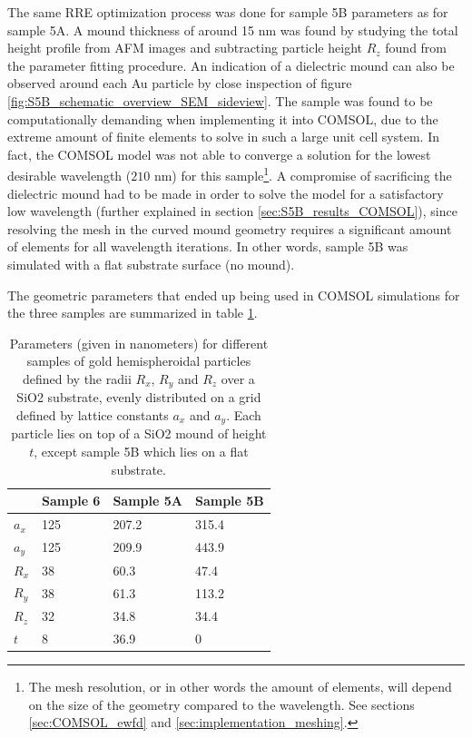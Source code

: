 The same RRE optimization process was done for sample 5B parameters as for sample 5A. A mound thickness of around 15 nm was found by studying the total height profile from AFM images and subtracting particle height $R_z$ found from the parameter fitting procedure. An indication of a dielectric mound can also be observed around each Au particle by close inspection of figure \ref{fig:S5B_schematic_overview_SEM_sideview}. The sample was found to be computationally demanding when implementing it into COMSOL, due to the extreme amount of finite elements to solve in such a large unit cell system. In fact, the COMSOL model was not able to converge a solution for the lowest desirable wavelength ($210$ nm) for this sample\footnote{The mesh resolution, or in other words the amount of elements, will depend on the size of the geometry compared to the wavelength. See sections \ref{sec:COMSOL_ewfd} and \ref{sec:implementation_meshing}.}. A compromise of sacrificing the dielectric mound had to be made in order to solve the model for a satisfactory low wavelength (further explained in section \ref{sec:S5B_results_COMSOL}), since resolving the mesh in the curved mound geometry requires a significant amount of elements for all wavelength iterations. In other words, sample 5B was simulated with a flat substrate surface (no mound). 

The geometric parameters that ended up being used in COMSOL simulations for the three samples are summarized in table \ref{tab:GoldLatticeParameters}. 





\begin{table}[h!]
\centering
\caption{Parameters (given in nanometers) for different samples of gold hemispheroidal particles defined by the radii $R_x$, $R_y$ and $R_z$ over a SiO2 substrate, evenly distributed on a grid defined by lattice constants $a_x$ and $a_y$. Each particle lies on top of a SiO2 mound of height $t$, except sample 5B which lies on a flat substrate.}
\label{tab:GoldLatticeParameters}
\begin{tabular}{l l l l}
            &   Sample 6    &   Sample 5A   &   Sample 5B   \\
    \hline 
    $a_x$   &   125       &   207.2         &   315.4            \\
    $a_y$   &   125       &   209.9         &   443.9            \\
    $R_x$   &   38        &   60.3          &   47.4            \\
    $R_y$   &   38        &   61.3          &   113.2            \\
    $R_z$   &   32        &   34.8          &   34.4            \\
    $t$     &   8         &   36.9          &   0            \\
    \hline
\end{tabular}
\end{table}




